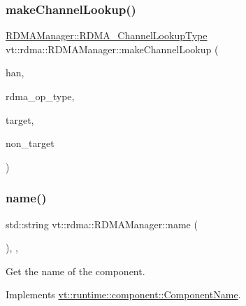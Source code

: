 \subsubsection{\texorpdfstring{make\+Channel\+Lookup()}{makeChannelLookup()}}
{\footnotesize\ttfamily \hyperlink{structvt_1_1rdma_1_1_r_d_m_a_manager_a3df5b264f344d9d4530a96264782a725}{R\+D\+M\+A\+Manager\+::\+R\+D\+M\+A\+\_\+\+Channel\+Lookup\+Type} vt\+::rdma\+::\+R\+D\+M\+A\+Manager\+::make\+Channel\+Lookup (\begin{DoxyParamCaption}\item[{\hyperlink{namespacevt_a10442579ec4e7ebef223818e64bcf908}{R\+D\+M\+A\+\_\+\+Handle\+Type} const \&}]{han,  }\item[{\hyperlink{namespacevt_1_1rdma_ac848e1d9da43db6294bd06f83e5d3946}{R\+D\+M\+A\+\_\+\+Type\+Type} const \&}]{rdma\+\_\+op\+\_\+type,  }\item[{\hyperlink{namespacevt_a866da9d0efc19c0a1ce79e9e492f47e2}{Node\+Type} const \&}]{target,  }\item[{\hyperlink{namespacevt_a866da9d0efc19c0a1ce79e9e492f47e2}{Node\+Type} const \&}]{non\+\_\+target }\end{DoxyParamCaption})\hspace{0.3cm}{\ttfamily [private]}}

\mbox{\label{structvt_1_1rdma_1_1_r_d_m_a_manager_add0f236b62fd550b8eb3d78156a97403}} 
\subsubsection{\texorpdfstring{name()}{name()}}
{\footnotesize\ttfamily std\+::string vt\+::rdma\+::\+R\+D\+M\+A\+Manager\+::name (\begin{DoxyParamCaption}{ }\end{DoxyParamCaption})\hspace{0.3cm}{\ttfamily [inline]}, {\ttfamily [override]}, {\ttfamily [virtual]}}



Get the name of the component. 



Implements \hyperlink{structvt_1_1runtime_1_1component_1_1_component_name_a33c06229bb605a2b2ceff68830d6d773}{vt\+::runtime\+::component\+::\+Component\+Name}.

